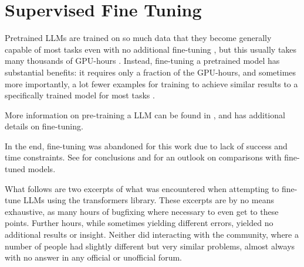 


\section{Supervised Fine Tuning}\label{sec:res:sft}
Pretrained \glspl{LLM} are trained on so much data that they become generally capable of most tasks even with no additional fine-tuning \cite{brown_language_2020}, but this usually takes many thousands of GPU-hours \cite{touvron_llama_2023, scao_what_2022}.
Instead, fine-tuning a pretrained model has substantial benefits: it requires only a fraction of the GPU-hours, and sometimes more importantly, a lot fewer examples for training to achieve similar results to a specifically trained model for most tasks \cite{gaddipati_comparative_2020}.

More information on pre-training a \gls{LLM} can be found in , and  has additional details on fine-tuning.

In the end, fine-tuning was abandoned for this work due to lack of success and time constraints. See  for conclusions and  for an outlook on comparisons with fine-tuned models.

What follows are two excerpts of what was encountered when attempting to fine-tune \glspl{LLM} using the \gls{transformers} library.
These excerpts are by no means exhaustive, as many hours of bugfixing where necessary to even get to these points.
Further hours, while sometimes yielding different errors, yielded no additional results or insight.
Neither did interacting with the community, where a number of people had slightly different but very similar problems, almost always with no answer in any official or unofficial forum.

%


